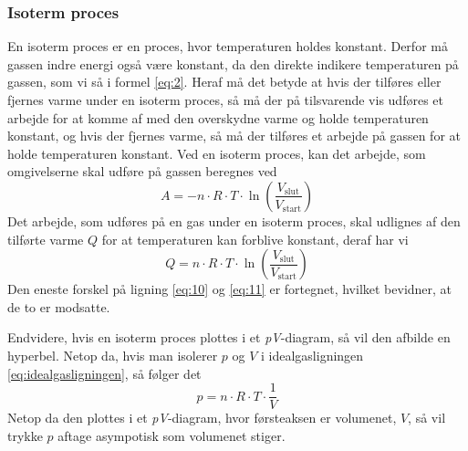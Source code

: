 \documentclass[SRC.tex]{subfiles}
\begin{document}
	\subsubsection{Isoterm proces}
	En isoterm proces er en proces, hvor temperaturen holdes konstant. 
	Derfor må gassen indre energi også være konstant, da den direkte 
	indikere temperaturen på gassen, som vi så i formel \eqref{eq:2}.
	Heraf må det betyde at hvis der tilføres eller fjernes varme under en 
	isoterm proces, så må der på tilsvarende vis udføres et arbejde for
	at komme af med den overskydne varme og holde temperaturen konstant,
	og hvis der fjernes varme, så må der tilføres et arbejde på gassen
	for at holde temperaturen konstant. Ved en isoterm proces, kan det 
	arbejde, som omgivelserne skal udføre på gassen beregnes ved
	\begin{equation}
	A = -n \cdot R \cdot T \cdot \ln\left(\frac{V_{\text{slut}}}{V_{\text{start}}}\right)
	\label{eq:10}
	\end{equation}
	Det arbejde, som udføres på en gas under en isoterm proces, skal 
	udlignes af den tilførte varme \(Q\) for at temperaturen kan forblive
	konstant, deraf har vi
	\begin{equation}
	Q = n \cdot R \cdot T \cdot \ln\left(\frac{V_{\text{slut}}}{V_{\text{start}}}\right)
	\label{eq:11}
	\end{equation}
	Den eneste forskel på ligning \eqref{eq:10} og \eqref{eq:11} er fortegnet,
	hvilket bevidner, at de to er modsatte.
	
	Endvidere, hvis en isoterm proces plottes i et \textit{pV}-diagram, så 
	vil den afbilde en hyperbel. Netop da, hvis man isolerer \(p\) og \(V\)
	i idealgasligningen \eqref{eq:idealgasligningen}, så følger det
	\begin{equation}
	p = n \cdot R \cdot T \cdot \frac{1}{V}
	\end{equation}
	Netop da den plottes i et \textit{pV}-diagram, hvor førsteaksen er volumenet,
	\(V\), så vil trykke \(p\) aftage asympotisk som volumenet stiger. 
\end{document}
